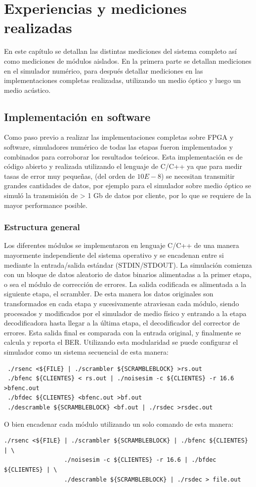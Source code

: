 \chapter{Experiencias y mediciones realizadas}
En este capítulo se detallan las distintas mediciones del sistema completo así como mediciones de módulos aislados. 
En la primera parte se detallan mediciones en el simulador numérico, para después detallar mediciones en las implementaciones completas realizadas, utilizando un medio óptico y luego un medio acústico.
\section{Implementación en software}
Como paso previo a realizar las implementaciones completas sobre FPGA y software, simuladores numérico de todas las etapas fueron implementados y combinados para corroborar los resultados teóricos. Esta implementación es de código abierto y realizada utilizando el lenguaje de C/C++ ya que para medir tasas de error muy pequeñas, (del orden de $10E-8$) se necesitan transmitir grandes cantidades de datos, por ejemplo para el simulador sobre medio óptico se simuló la transmisión de > 1 Gb de datos por cliente, por lo que se requiere de la mayor performance posible.
\subsection{Estructura general}
Los diferentes módulos se implementaron en lenguaje C/C++ de una manera mayormente independiente del sistema operativo y se encadenan entre si mediante la entrada/salida estándar (STDIN/STDOUT). La simulación comienza con un bloque de datos aleatorio de datos binarios alimentadas a la primer etapa, o sea el módulo de corrección de errores. La salida codificada es alimentada a la siguiente etapa, el scrambler. De esta manera los datos originales son transformados en cada etapa y sucesivamente atraviesan cada módulo, siendo procesados y modificados por el simulador de medio físico y entrando a la etapa decodificadora hasta llegar a la última etapa, el decodificador del corrector de errores. Esta salida final es comparada con la entrada original, y finalmente se calcula y reporta el BER.
Utilizando esta modularidad se puede configurar el simulador como un sistema secuencial de esta manera:

\small
\begin{verbatim}
 ./rsenc <${FILE} | ./scrambler ${SCRAMBLEBLOCK} >rs.out
 ./bfenc ${CLIENTES} < rs.out | ./noisesim -c ${CLIENTES} -r 16.6 >bfenc.out
 ./bfdec ${CLIENTES} <bfenc.out >bf.out
 ./descramble ${SCRAMBLEBLOCK} <bf.out | ./rsdec >rsdec.out
\end{verbatim}
\normalsize
O bien encadenar cada módulo utilizando un solo comando de esta manera:
\small
\begin{verbatim}
./rsenc <${FILE} | ./scrambler ${SCRAMBLEBLOCK} | ./bfenc ${CLIENTES} | \
                 ./noisesim -c ${CLIENTES} -r 16.6 | ./bfdec ${CLIENTES} | \ 
                 ./descramble ${SCRAMBLEBLOCK} | ./rsdec > file.out
\end{verbatim}
\normalsize

